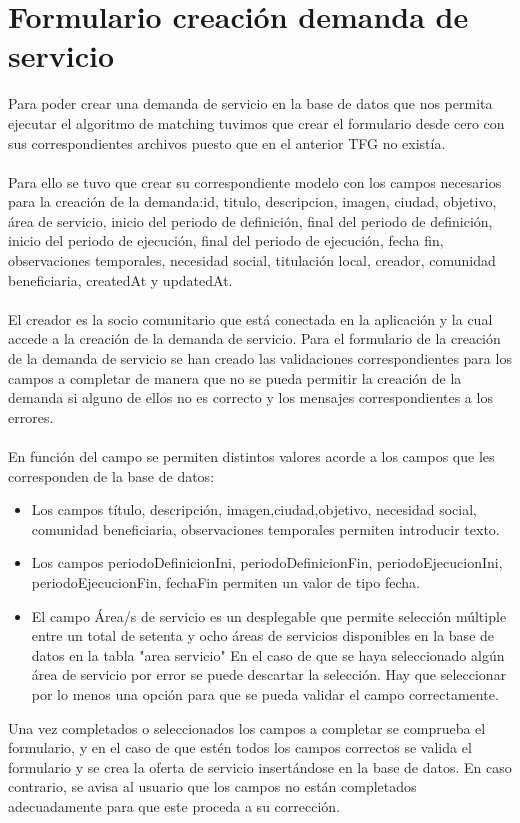 \documentclass[11pt]{book}
\begin{document}
\section{Formulario creación demanda de servicio}
Para poder crear una demanda de servicio en la base de datos que nos permita ejecutar el algoritmo de matching tuvimos que crear el formulario desde cero con sus correspondientes archivos puesto que en el anterior TFG no existía.\\\\
Para ello se tuvo que crear su correspondiente modelo con los campos necesarios para la creación de la demanda:id, titulo, descripcion, imagen, ciudad, objetivo, área de servicio, inicio del periodo de definición, final del periodo de definición, inicio del periodo de ejecución, final del periodo de ejecución, fecha fin, observaciones temporales, necesidad social, titulación local, creador, comunidad beneficiaria, createdAt y updatedAt.\\\\
El creador es la socio comunitario que está conectada en la aplicación y la cual accede a la creación de la demanda de servicio.
Para el formulario de la creación de la demanda de servicio se han creado las validaciones correspondientes para los campos a completar de manera que no se pueda permitir la creación de la demanda si alguno de ellos no es correcto y los mensajes correspondientes a los errores.\\\\
En función del campo se permiten distintos valores acorde a los campos que les corresponden de la base de datos: \\
\begin{itemize} 
	\item Los campos título, descripción, imagen,ciudad,objetivo, necesidad social, comunidad beneficiaria, observaciones temporales permiten introducir texto. 
	\item  Los campos periodoDefinicionIni, periodoDefinicionFin, periodoEjecucionIni, periodoEjecucionFin, fechaFin permiten un valor de tipo fecha.
	\item El campo Área/s de servicio es un desplegable que permite selección múltiple entre un total de setenta y ocho áreas de servicios disponibles en la base de datos en la tabla "area servicio" En el caso de que se haya seleccionado algún área de servicio por error se puede descartar la selección. Hay que seleccionar por lo menos una opción para que se pueda validar el campo correctamente.
\end{itemize}
Una vez completados o seleccionados los campos a completar se comprueba el formulario, y en el caso de que estén todos los campos correctos se valida el formulario y se crea la oferta de servicio insertándose en la base de datos. En caso contrario, se avisa al usuario que los campos no están completados adecuadamente para que este proceda a su corrección.\\\\
\end{document}
